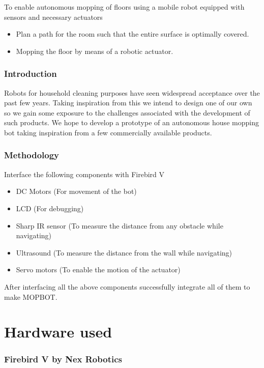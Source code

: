 \documentclass[12pt]{article}
\begin{document}
To enable autonomous mopping of floors using a mobile robot equipped with sensors and necessary actuators

\begin{itemize}
\item Plan a path for the room such that the entire surface is optimally covered.
\item Mopping the floor by means of a robotic actuator.
\end{itemize}

\section{Introduction}

Robots for household cleaning purposes have seen widespread acceptance over the past few years. Taking inspiration from this we intend to design one of our own so we gain some exposure to the challenges associated with the development of such products.
We hope to develop a prototype of an autonomous house mopping bot taking inspiration from a few commercially available products.
  
\section{Methodology}

Interface the following components with Firebird V
\begin{itemize}
\item DC Motors (For movement of the bot)
\item LCD (For debugging)
\item Sharp IR sensor (To measure the distance from any obstacle while navigating) 
\item Ultrasound (To measure the distance from the wall while navigating)
\item Servo motors (To enable the motion of the actuator)
\end{itemize}

\noindent After interfacing all the above components successfully integrate all of them to make MOPBOT. 

\part{Hardware used}

\section{Firebird V by Nex Robotics}
\end{document}
